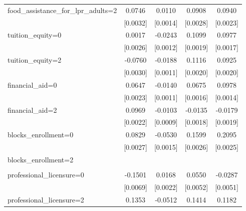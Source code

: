 \begin{table}[htbp]
\begin{tabular}{l*{4}{c}}
\addlinespace
food\_assistance\_for\_lpr\_adults=2&      0.0746\sym{***}&      0.0110\sym{***}&      0.0908\sym{***}&      0.0940\sym{***}\\
                    &    [0.0032]         &    [0.0014]         &    [0.0028]         &    [0.0023]         \\
\addlinespace
tuition\_equity=0    &      0.0017         &     -0.0243\sym{***}&      0.1099\sym{***}&      0.0977\sym{***}\\
                    &    [0.0026]         &    [0.0012]         &    [0.0019]         &    [0.0017]         \\
\addlinespace
tuition\_equity=2    &     -0.0760\sym{***}&     -0.0188\sym{***}&      0.1116\sym{***}&      0.0925\sym{***}\\
                    &    [0.0030]         &    [0.0011]         &    [0.0020]         &    [0.0020]         \\
\addlinespace
financial\_aid=0     &      0.0647\sym{***}&     -0.0140\sym{***}&      0.0675\sym{***}&      0.0978\sym{***}\\
                    &    [0.0023]         &    [0.0011]         &    [0.0016]         &    [0.0014]         \\
\addlinespace
financial\_aid=2     &      0.0969\sym{***}&     -0.0103\sym{***}&     -0.0135\sym{***}&     -0.0179\sym{***}\\
                    &    [0.0022]         &    [0.0009]         &    [0.0018]         &    [0.0019]         \\
\addlinespace
blocks\_enrollment=0 &      0.0829\sym{***}&     -0.0530\sym{***}&      0.1599\sym{***}&      0.2095\sym{***}\\
                    &    [0.0027]         &    [0.0015]         &    [0.0026]         &    [0.0025]         \\
\addlinespace
blocks\_enrollment=2 &                     &                     &                     &                     \\
                    &                     &                     &                     &                     \\
\addlinespace
professional\_licensure=0&     -0.1501\sym{***}&      0.0168\sym{***}&      0.0550\sym{***}&     -0.0287\sym{***}\\
                    &    [0.0069]         &    [0.0022]         &    [0.0052]         &    [0.0051]         \\
\addlinespace
professional\_licensure=2&      0.1353\sym{***}&     -0.0512\sym{***}&      0.1414\sym{***}&      0.1182\sym{***}\\

\end{tabular}
\end{table}
